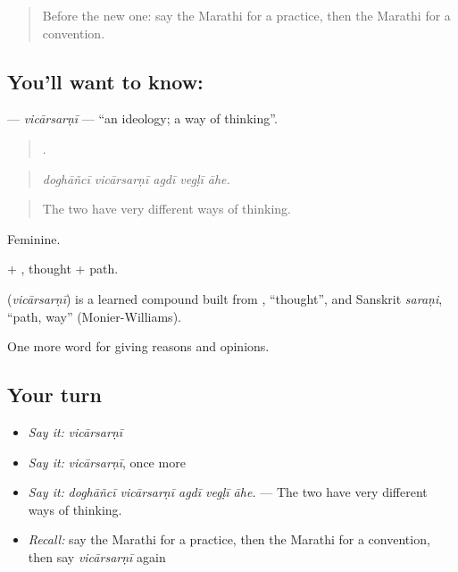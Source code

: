 \label{lesson:MR-C367-vicarsarni}



\begin{quote}
Before the new one: say the Marathi for a practice, then the Marathi for a convention.
\end{quote}

\subsection*{You'll want to know: }
\textbf{} — \emph{vicārsarṇī} — \textquotedblleft{}an ideology; a way of thinking\textquotedblright{}.

\begin{quote}
    .
\end{quote}

\begin{quote}
\emph{doghāñcī vicārsarṇī agdī vegḷī āhe.}
\end{quote}

\begin{quote}
The two have very different ways of thinking.
\end{quote}

Feminine.

 + , thought + path.

\begin{cousinweb}
\textbf{} (\emph{vicārsarṇī}) is a learned compound built from , \textquotedblleft{}thought\textquotedblright{}, and Sanskrit \emph{saraṇi}, \textquotedblleft{}path, way\textquotedblright{} (Monier-Williams).
\end{cousinweb}

\begin{grammarlens}[title={What you've built}]
One more word for giving reasons and opinions.
\end{grammarlens}

\subsection*{Your turn}
\begin{itemize}
\raggedright
  \item \emph{Say it:} \emph{vicārsarṇī}
  \item \emph{Say it:} \emph{vicārsarṇī}, once more
  \item \emph{Say it:} \emph{doghāñcī vicārsarṇī agdī vegḷī āhe.} — The two have very different ways of thinking.
  \item \emph{Recall:} say the Marathi for a practice, then the Marathi for a convention, then say \emph{vicārsarṇī} again
\end{itemize}

